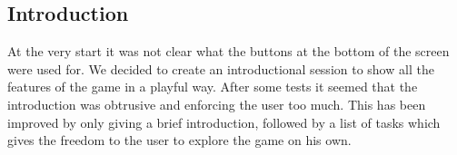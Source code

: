 \subsection{Introduction}
At the very start it was not clear what the buttons at the bottom of the screen were used for. We decided to create an introductional session to show all the features of the game in a playful way. After some tests it seemed that the introduction was obtrusive and enforcing the user too much. This has been improved by only giving a brief introduction, followed by a list of tasks which gives the freedom to the user to explore the game on his own.